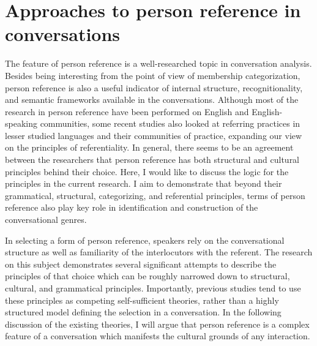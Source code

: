 \documentclass[12pt]{article}
\begin{document}
\section{Approaches to person reference in conversations}
The feature of person reference is a well-researched topic in conversation analysis. Besides being interesting from the point of view of membership categorization, person reference is also a useful indicator of internal structure, recognitionality, and semantic frameworks available in the conversations. Although most of the research in person reference have been performed on English and English-speaking communities, some recent studies also looked at referring practices in lesser studied languages and their communities of practice, expanding our view on the principles of referentiality. In general, there seems to be an agreement between the researchers that person reference has both structural and cultural principles behind their choice. Here, I would like to discuss the logic for the principles in the current research. I aim to demonstrate that beyond their grammatical, structural, categorizing, and referential principles, terms of person reference also play key role in identification and construction of the conversational genres.

In selecting a form of person reference, speakers rely on the conversational structure as well as familiarity of the interlocutors with the referent. The research on this subject demonstrates several significant attempts to describe the principles of that choice which can be roughly narrowed down to structural, cultural, and grammatical principles. Importantly, previous studies tend to use these principles as competing self-sufficient theories, rather than a highly structured model defining the selection in a conversation. In the following discussion of the existing theories, I will argue that person reference is a complex feature of a conversation which manifests the cultural grounds of any interaction.
\end{document}
